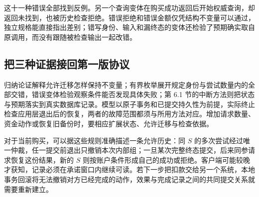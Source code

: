这十一种错误全部找到反例。另一个查询变体在购买成功返回后开始权威查询，却返回未找到，也被历史检查拒绝。错误拒绝和错误金额仅凭结构不变量可以通过，独立规格能直接指出差别；错写身份、输入和漏终态的变体还检验了预期确实取自原调用，而没有跟随被检查输出一起改错。

\subsection*{把三种证据接回第一版协议}

归纳论证解释允许迁移怎样保持不变量；有界枚举展开规定身份与尝试数量内的全部交错，错误变体检验观察条件能否发现具体失败；第 6.1 节的中断方法则把状态与预期落实到真实数据库记录。模型以原子事务和已提交持久性为前提，实际终止检查应用层退出后的恢复，两者的故障范围都须与所用方法对应。增加请求数量、资金动作或恢复旧备份时，要相应扩展状态、允许迁移与检查依据。

对于当前购买，可以据这些规则准确描述一条允许历史：同 \(S\) 的多次尝试经过唯一仲裁，任一提交前退出只撤销本次内部组；一旦某次完整终态提交，后来同参请求恢复这份结果，新的 \(S\) 则按账户条件形成自己的成功或拒绝。客户端可能较晚才获知，记录必须在承诺窗口内继续可读。若下一步把扣款交给另一个系统，本地事务回滚将无法撤销对方已经完成的动作，效果与完成记录之间的共同提交关系就需要重新建立。
\FloatBarrier
